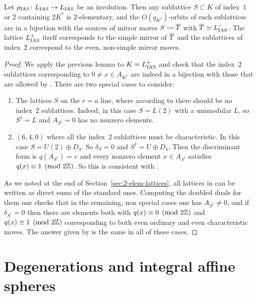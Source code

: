 \documentclass{amsart}
\begin{document}
\begin{theorem}\label{thm:reverse-direction}
  Let $\rho_{\rm IAS}\colon L_{\rm IAS}\to L_{\rm IAS}$ be an involution.  Then any
  sublattice $S\subset K$ of index~$1$ or $2$ containing $2K^*$ is
  $2$-elementary, and the $O(q_{K^\dag})$-orbits of such sublattices
  are in a bijection with the sources of mirror moves
  $S\leadsto{\overline T}$ with 
  ${\overline T}\simeq L_{\rm IAS}^-$. The lattice $L_{\rm IAS}^+$ itself corresponds to
  the simple mirror of ${\overline T}$ and the sublattices of index~$2$
  correspond to the even, non-simple mirror moves.
\end{theorem}
\begin{proof}
  We apply the previous lemma to $K=L_{\rm IAS}^+$ and 
  check that the index~$2$ sublattices corresponding to
  $0\ne x\in A_{K^\dag}$ are indeed in a bijection with those that are
  allowed by \fign.
  There are two special cases to consider:
  \begin{enumerate}
  \item The lattices $S$ on the $r=a$ line, where according to \fignb
    there should be no index~$2$ sublattices. Indeed, in this case
    $S=L(2)$ with a unimodular $L$, so $S^\dag = L$ and
    $A_{S^\dag} =0$ has no nonzero elements.
  \item $(6,4,0)$ where all the index~$2$ sublattices must be
    characteristic. In this case $S=U(2)\oplus D_4$. So $\delta_S=0$ and
    $S^\dag = U\oplus D_4$. Then the discriminant form is
    $q(A_{S^\dag})=v$ and every nonzero element $x\in A_{S^\dag}$
    satisfies $q(x)\equiv 1\pmod {2{\mathbb Z}}$. So this is consistent with \fign.
  \end{enumerate}

  As we noted at the end of Section~\ref{sec:2-elem-lattices}, all
  lattices in \fignb can be written as direct sums of the standard
  ones. Computing the doubled duals for them one checks that in the
  remaining, non special cases one has $A_{S^\dag}\ne 0$, and if
  $\delta_{S^\dag}=0$ then there are elements both with
  $q(x)\equiv 0\pmod {2{\mathbb Z}}$ and $q(x)\equiv 1\pmod{2{\mathbb Z}}$
  corresponding to both even ordinary and even characteristic
  moves. The answer given by \fignb is the same in all of these cases.
\end{proof}

\section{Degenerations and integral affine spheres} 
\label{sec:kulikov+ias}
\end{document}
